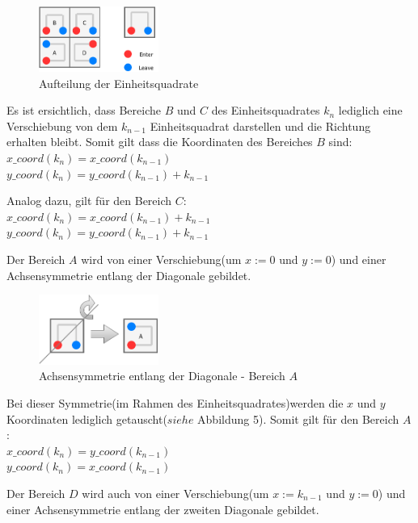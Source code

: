 \documentclass[course=erap]{aspdoc}
\begin{document}
\begin{figure}[h]
    \centering
    \includegraphics[width=0.35\textwidth, height=0.12\textheight]{../img/hblocks.png}
    \caption{Aufteilung der Einheitsquadrate}
\end{figure}

Es ist ersichtlich, dass Bereiche $B$ und $C$ des Einheitsquadrates $k_{n}$
lediglich eine Verschiebung von dem $k_{n-1}$ Einheitsquadrat darstellen und
die Richtung erhalten bleibt. Somit gilt dass die Koordinaten des Bereiches $B$
sind:\\
$x\_coord(k_{n})=x\_coord(k_{n-1})$\\
$y\_coord(k_{n})=y\_coord(k_{n-1})+k_{n-1}$

Analog dazu, gilt für den Bereich $C$:\\
$x\_coord(k_{n})=x\_coord(k_{n-1})+k_{n-1}$\\
$y\_coord(k_{n})=y\_coord(k_{n-1})+k_{n-1}$

Der Bereich $A$ wird von einer Verschiebung(um $x:=0$ und $y:=0$) und einer
Achsensymmetrie entlang der Diagonale gebildet.

\begin{figure}[H]
    \centering
    \includegraphics[width=0.35\textwidth,  height=0.12\textheight]{../img/BereichA.png}
    \caption{Achsensymmetrie entlang der Diagonale - Bereich $A$}
\end{figure}

Bei dieser Symmetrie(im Rahmen des Einheitsquadrates)werden die $x$ und $y$
Koordinaten lediglich getauscht($siehe$ Abbildung  5). Somit gilt für den
Bereich $A$:\\
$x\_coord(k_{n})=y\_coord(k_{n-1})$\\
$y\_coord(k_{n})=x\_coord(k_{n-1})$

Der Bereich $D$ wird auch von einer Verschiebung(um $x:=k_{n-1}$ und $y:=0$)
und einer Achsensymmetrie entlang der zweiten Diagonale gebildet.
\end{document}

